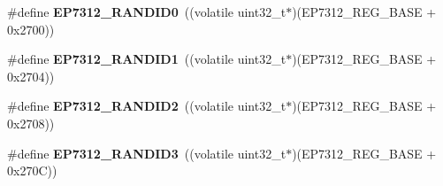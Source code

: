 \begin{DoxyCompactItemize}
\#define {\bfseries E\+P7312\+\_\+\+R\+A\+N\+D\+I\+D0}~((volatile uint32\+\_\+t$\ast$)(E\+P7312\+\_\+\+R\+E\+G\+\_\+\+B\+A\+SE + 0x2700))
\item 
\mbox{\label{group__edb7312__registers_ga03662eabc9f27f6cda8e58e3f67d402a}} 
\#define {\bfseries E\+P7312\+\_\+\+R\+A\+N\+D\+I\+D1}~((volatile uint32\+\_\+t$\ast$)(E\+P7312\+\_\+\+R\+E\+G\+\_\+\+B\+A\+SE + 0x2704))
\item 
\mbox{\label{group__edb7312__registers_ga4bee96bb916568b4485755b524509db5}} 
\#define {\bfseries E\+P7312\+\_\+\+R\+A\+N\+D\+I\+D2}~((volatile uint32\+\_\+t$\ast$)(E\+P7312\+\_\+\+R\+E\+G\+\_\+\+B\+A\+SE + 0x2708))
\item 
\mbox{\label{group__edb7312__registers_ga80cb374345c6bf368143d69c1151cf5b}} 
\#define {\bfseries E\+P7312\+\_\+\+R\+A\+N\+D\+I\+D3}~((volatile uint32\+\_\+t$\ast$)(E\+P7312\+\_\+\+R\+E\+G\+\_\+\+B\+A\+SE + 0x270\+C))
\end{DoxyCompactItemize}
